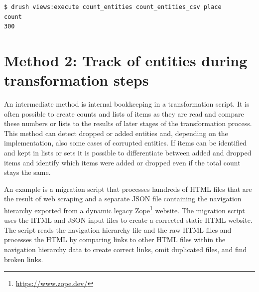 \documentclass[final]{anthology-ch} %
\begin{document}
\begin{listing}
\begin{verbatim}
$ drush views:execute count_entities count_entities_csv place
count
300
\end{verbatim}
\label{code:ismi-cnt}
\end{listing}

\section{Method 2: Track of entities during transformation steps}

An intermediate method is internal bookkeeping in a transformation script. It is often possible to create counts and lists of items as they are read and compare these numbers or lists to the results of later stages of the transformation process. This method can detect dropped or added entities and, depending on the implementation, also some cases of corrupted entities. If items can be identified and kept in lists or sets it is possible to differentiate between added and dropped items and identify which items were added or dropped even if the total count stays the same.

An example is a migration script that processes hundreds of HTML files that are the result of web scraping and a separate JSON file containing the navigation hierarchy exported from a dynamic legacy Zope\footnote{\url{https://www.zope.dev/}} website. The migration script uses the HTML and JSON input files to create a corrected static HTML website. The script reads the navigation hierarchy file and the raw HTML files and processes the HTML by comparing links to other HTML files within the navigation hierarchy data to create correct links, omit duplicated files, and find broken links.
\end{document}
